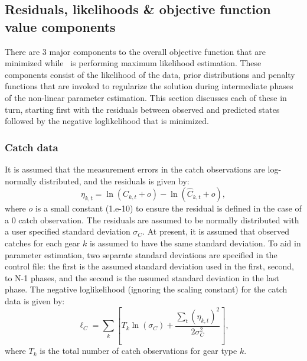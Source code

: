 \subsection{Residuals, likelihoods \& objective function value components}
\begin{multicols}{2}
There are 3 major components to the overall objective function that are minimized while \iscam\ is performing maximum likelihood estimation.  These components consist of the likelihood of the data, prior distributions and penalty functions that are invoked to regularize the solution during intermediate phases of the non-linear parameter estimation.  This section discusses each of these in turn, starting first with the residuals between observed and predicted states followed by the negative loglikelihood that is minimized.

\subsubsection{Catch data}
It is assumed that the measurement errors in the catch observations are log-normally distributed, and the residuals is given by:
\begin{equation}\label{eq2}
\eta_{k,t}=\ln(C_{k,t}+o) -  \ln(\hat{C}_{k,t}+o),
\end{equation}
where $o$ is  a small constant (1.e-10) to ensure the residual is defined in the case of a 0 catch observation.  The residuals are assumed to be normally distributed with a user specified standard deviation $\sigma_{C}$.  At present, it is assumed that observed catches for each gear $k$ is assumed to have the same standard deviation.  To aid in parameter estimation, two separate standard deviations are specified in the control file: the first is the assumed standard deviation used in the first, second, to N-1 phases, and the second is the assumed standard deviation in the last phase.  The negative loglikelihood (ignoring the scaling constant) for the catch data is given by:
\begin{equation}\label{eq3}
\ell_C = \sum_k\left[  T_k\ln(\sigma_C)+\frac{\sum_t(\eta_{k,t})^2}{2\sigma_C^2}\right],
\end{equation}
where $T_k$ is the total number of catch observations for gear type $k$.



\end{multicols}
